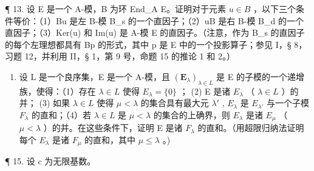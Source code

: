 ¶ 13. 设 E 是一个 A-模，B 为环 End\_A E。证明对于元素 \(u \in B\) ，以下三个条件等价：（1）Bu 是左 B-模 B\_s 的一个直因子；（2）uB 是右 B-模 B\_d 的一个直因子；（3）Ker(u) 和 Im(u) 是 A-模 E 的直因子。（注意，作为 B\_s 的直因子的每个左理想都具有 Bp 的形式，其中 p 是 E 中的一个投影算子；参见 I，§ 8，习题 12，并利用 II，§ 1，第 9 号，命题 15 的推论 1 和 2。）

\begin{enumerate}
\def\labelenumi{\arabic{enumi}.}
\setcounter{enumi}{13}
\tightlist
\item
  设 L 是一个良序集，E 是一个 A-模，且 \((\mathbf{E}_{\lambda})_{\lambda \in L}\) 是 E 的子模的一个递增族，使得：（1）存在 \(\lambda \in L\) 使得 \(E_{\lambda} = \{0\}\) ； (2) E 是诸 \(E_{\lambda}\) （ \(\lambda \in L\) ）的并； (3) 如果 \(\lambda \in L\) 使得 \(\mu < \lambda\) 的集合具有最大元 \(\lambda'\) , \(E_{\lambda}\) 是 \(E_{\lambda'}\) 与一个子模 \(F_{\lambda}\) 的直和；（4）若 \(\lambda \in L\) 是 \(\mu < \lambda\) 的集合的上确界，则 \(E_{\lambda}\) 是诸 \(E_{\mu}\) （ \(\mu < \lambda\) ）的并。在这些条件下，证明 E 是诸 \(F_{\lambda}\) 的直和。（用超限归纳法证明每个 \(E_{\lambda}\) 是诸 \(F_{\mu}\) 的直和，其中 \(\mu \leqslant \lambda\) 。)
\end{enumerate}

¶ 15. 设 c 为无限基数。

